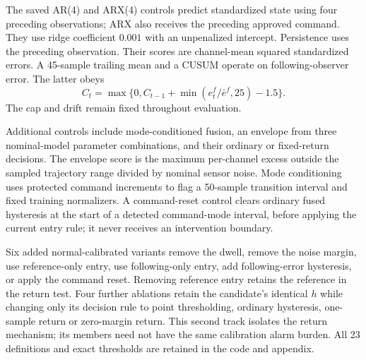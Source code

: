The saved AR(4) and ARX(4) controls predict standardized state using four preceding observations; ARX also receives the preceding approved command. They use ridge coefficient $0.001$ with an unpenalized intercept. Persistence uses the preceding observation. Their scores are channel-mean squared standardized errors. A 45-sample trailing mean and a CUSUM operate on following-observer error. The latter obeys
\begin{equation}
 C_t=\max\{0,C_{t-1}+\min(e_t^f/\bar e^f,25)-1.5\}.
\end{equation}
The cap and drift remain fixed throughout evaluation.

Additional controls include mode-conditioned fusion, an envelope from three nominal-model parameter combinations, and their ordinary or fixed-return decisions. The envelope score is the maximum per-channel excess outside the sampled trajectory range divided by nominal sensor noise. Mode conditioning uses protected command increments to flag a 50-sample transition interval and fixed training normalizers. A command-reset control clears ordinary fused hysteresis at the start of a detected command-mode interval, before applying the current entry rule; it never receives an intervention boundary.

Six added normal-calibrated variants remove the dwell, remove the noise margin, use reference-only entry, use following-only entry, add following-error hysteresis, or apply the command reset. Removing reference entry retains the reference in the return test. Four further ablations retain the candidate's identical $h$ while changing only its decision rule to point thresholding, ordinary hysteresis, one-sample return or zero-margin return. This second track isolates the return mechanism; its members need not have the same calibration alarm burden. All 23 definitions and exact thresholds are retained in the code and appendix.
